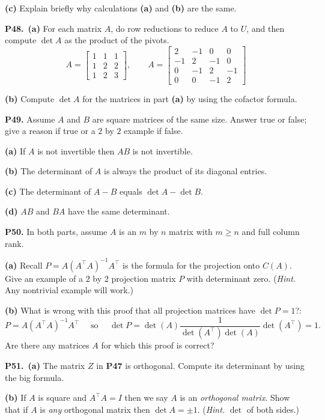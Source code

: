 \documentclass[12pt]{amsart}
\newcommand{\prob}[1]{\bigskip\noindent\textbf{#1.}\quad }
\newcommand{\epart}[1]{\medskip\noindent\textbf{(#1)}\quad }
\newcommand{\ppart}[1]{\,\textbf{(#1)}\quad }
\begin{document}
\epart{c}  Explain briefly why calculations \textbf{(a)} and \textbf{(b)} are the same.


\prob{P48}  \ppart{a} For each matrix $A$, do row reductions to reduce $A$ to $U$, and then compute $\det A$ as the product of the pivots.
  $$A = \begin{bmatrix} 1 & 1 & 1 \\ 1 & 2 & 2 \\ 1 & 2 & 3 \end{bmatrix}, \qquad A = \begin{bmatrix} 2 & -1 & 0 & 0 \\ -1 & 2 & -1 & 0 \\ 0 & -1 & 2 & -1 \\ 0 & 0 & -1 & 2  \end{bmatrix}$$

\epart{b}  Compute $\det A$ for the matrices in part \textbf{(a)} by using the cofactor formula.


\clearpage\newpage
\prob{P49}  Assume $A$ and $B$ are square matrices of the same size.  Answer true or false; give a reason if true or a $2$ by $2$ example if false.

\epart{a}  If $A$ is not invertible then $AB$ is not invertible.

\epart{b}  The determinant of $A$ is always the product of its diagonal entries.

\epart{c}  The determinant of $A-B$ equals $\det A - \det B$.

\epart{d}  $AB$ and $BA$ have the same determinant.


\prob{P50}  In both parts, assume $A$ is an $m$ by $n$ matrix with $m\ge n$ and full column rank.

\epart{a} Recall $P = A (A^\top A)^{-1} A^\top$ is the formula for the projection onto $C(A)$. Give an example of a $2$ by $2$ projection matrix $P$ with determinant zero.  (\emph{Hint.}  Any nontrivial example will work.)

\epart{b}  What is wrong with this proof that all projection matrices have $\det P = 1$?:
    $$P = A (A^\top A)^{-1} A^\top \quad \text{ so } \quad \det P = \det(A) \frac{1}{\det(A^\top) \det(A)} \det(A^\top) = 1.$$
Are there any matrices $A$ for which this proof is correct?


\prob{P51}  \ppart{a}  The matrix $Z$ in \textbf{P47} is orthogonal.  Compute its determinant by using the big formula.

\epart{b}  If $A$ is square and $A^\top A = I$ then we say $A$ is an \emph{orthogonal matrix}.  Show that if $A$ is \emph{any} orthogonal matrix then $\det A = \pm 1$.  (\emph{Hint.}  $\det$ of both sides.)
\end{document}
